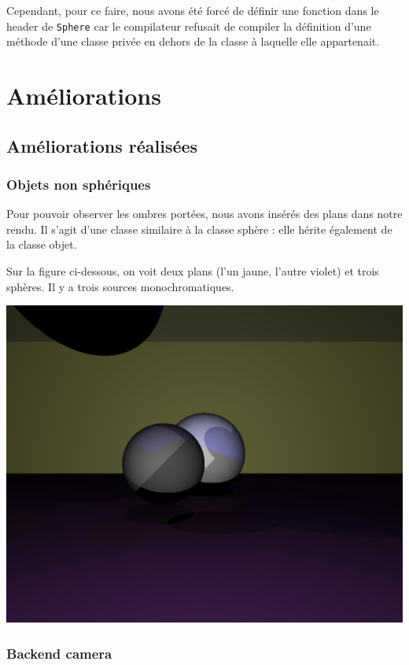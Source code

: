 \documentclass{article}
\begin{document}
Cependant, pour ce faire, nous avons été forcé de définir une fonction dans le header de \verb,Sphere, car
le compilateur refusait de compiler la définition d'une méthode d'une classe privée en dehors de la classe
à laquelle elle appartenait.

\section{Améliorations}
\subsection{Améliorations réalisées}
\subsubsection{Objets non sphériques}
Pour pouvoir observer les ombres portées, nous avons insérés des plans dans
notre rendu. Il s'agit d'une classe similaire à la classe sphère : elle hérite
également de la classe objet.

Sur la figure ci-dessous, on voit deux plans (l'un jaune, l'autre violet) et
trois sphères. Il y a trois sources monochromatiques.

\begin{center}
  \includegraphics[scale=0.2]{img/screenshot.png}
\end{center}


\subsubsection{Backend camera}
\end{document}
